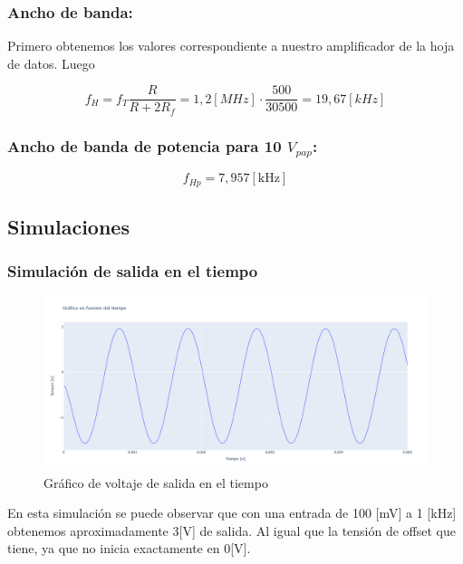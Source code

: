 \subsubsection{Ancho de banda:}

 Primero obtenemos los valores correspondiente a nuestro amplificador de la hoja de datos. Luego
 
\[ f_H = f_{T} \frac{R}{R+2 R_f} = 1,2 [MHz] \cdot \frac{500}{30500} = 19,67 [kHz] \]

\subsubsection{Ancho de banda de potencia para 10 $V_{pap}$:}
\[ f_{Hp}=7,957[\mathrm{kHz}] \]

  
 
\newpage

\subsection{Simulaciones}
\subsubsection{Simulación de salida en el tiempo}
 
\begin{figure}[h!]
    \centering
    \includegraphics[width=0.80\linewidth]{img/Lab2_1b_salida.png}
    \caption{Gráfico de voltaje de salida en el tiempo}
    \label{fig:tiempo}
\end{figure}

En esta simulación se puede observar que con una entrada de 100 [mV] a 1 [kHz] obtenemos aproximadamente 3[V] de salida. Al igual que la tensión de offset que tiene, ya que no inicia exactamente en 0[V].

